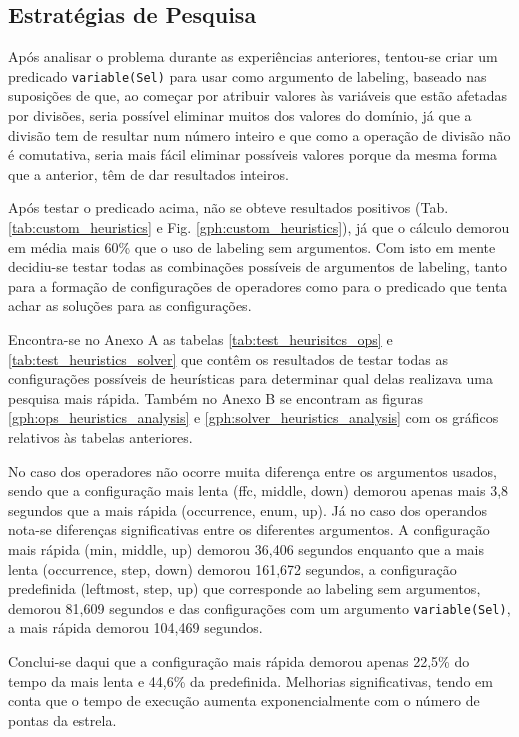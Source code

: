 \subsection{Estratégias de Pesquisa}

Após analisar o problema durante as experiências anteriores, tentou-se criar um predicado \verb|variable(Sel)| para usar como argumento de labeling, baseado nas suposições de que, ao começar por atribuir valores às variáveis que estão afetadas por divisões, seria possível eliminar muitos dos valores do domínio, já que a divisão tem de resultar num número inteiro e que como a operação de divisão não é comutativa, seria mais fácil eliminar possíveis valores porque da mesma forma que a anterior, têm de dar resultados inteiros.

Após testar o predicado acima, não se obteve resultados positivos (Tab. \ref{tab:custom_heuristics} e Fig. \ref{gph:custom_heuristics}), já que o cálculo demorou em média mais 60\% que o uso de labeling sem argumentos. Com isto em mente decidiu-se testar todas as combinações possíveis de argumentos de labeling, tanto para a formação de configurações de operadores como para o predicado que tenta achar as soluções para as configurações.

Encontra-se no Anexo A as tabelas \ref{tab:test_heurisitcs_ops} e \ref{tab:test_heuristics_solver} que contêm os resultados de testar todas as configurações possíveis de heurísticas para determinar qual delas realizava uma pesquisa mais rápida. Também no Anexo B se encontram as figuras \ref{gph:ops_heuristics_analysis} e \ref{gph:solver_heuristics_analysis} com os gráficos relativos às tabelas anteriores.

No caso dos operadores não ocorre muita diferença entre os argumentos usados, sendo que a configuração mais lenta (ffc, middle, down) demorou apenas mais 3,8 segundos que a mais rápida (occurrence, enum, up). Já no caso dos operandos nota-se diferenças significativas entre os diferentes argumentos. A configuração mais rápida (min, middle, up) demorou 36,406 segundos enquanto que a mais lenta (occurrence, step, down) demorou 161,672 segundos, a configuração predefinida (leftmost, step, up) que corresponde ao labeling sem argumentos, demorou 81,609 segundos e das configurações com um argumento \verb|variable(Sel)|, a mais rápida demorou 104,469 segundos.

Conclui-se daqui que a configuração mais rápida demorou apenas 22,5\% do tempo da mais lenta e 44,6\% da predefinida. Melhorias significativas, tendo em conta que o tempo de execução aumenta exponencialmente com o número de pontas da estrela.

